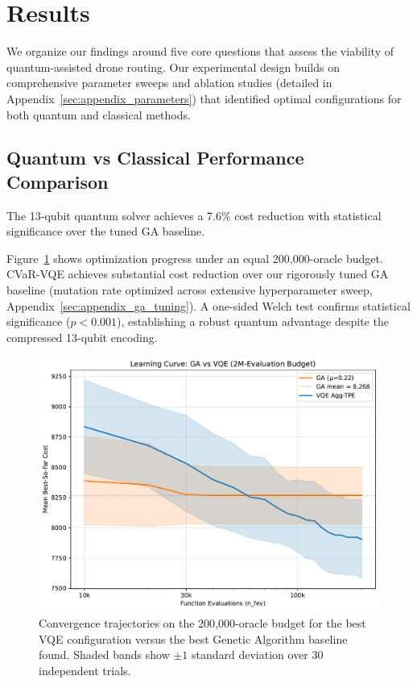 \section{Results}
\label{sec:results}

We organize our findings around five core questions that assess the viability 
of quantum-assisted drone routing. Our experimental design builds on comprehensive 
parameter sweeps and ablation studies (detailed in Appendix~\ref{sec:appendix_parameters}) 
that identified optimal configurations for both quantum and classical methods.

\subsection{Quantum vs Classical Performance Comparison}

The 13-qubit quantum solver achieves a 7.6\% cost reduction with statistical 
significance over the tuned GA baseline.

Figure~\ref{fig:learning_curves} shows optimization progress under an equal
200{,}000-oracle budget. CVaR-VQE achieves substantial cost reduction over 
our rigorously tuned GA baseline (mutation rate optimized across extensive 
hyperparameter sweep, Appendix~\ref{sec:appendix_ga_tuning}). A one-sided Welch test confirms statistical significance 
($p<0.001$), establishing a robust quantum advantage despite the compressed 
13-qubit encoding.

\begin{figure}[h]
  \centering
  \includegraphics[width=.7\linewidth]{fig/learning_curves_comparison.pdf}
  \caption{Convergence trajectories on the 200{,}000-oracle budget for the best VQE configuration versus the best Genetic Algorithm baseline found.  
           Shaded bands show $\pm1$ standard deviation over 30 independent trials.}
  \label{fig:learning_curves}
\end{figure}

